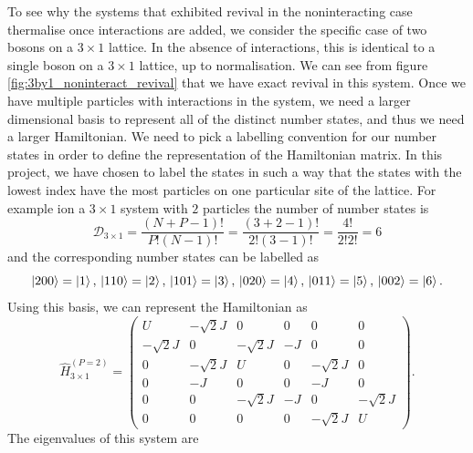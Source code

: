 \documentclass[a4paper, 10pt]{article}
\theoremstyle{plain}
\begin{document}
To see why the systems that exhibited revival in the noninteracting case
thermalise once interactions are added, we consider the specific case of
two bosons on a $3\times1$ lattice. In the absence of interactions, this
is identical to a single boson on a $3\times1$ lattice, up to normalisation.
We can see from figure \ref{fig:3by1_noninteract_revival} that we have exact revival
in this system. Once we have multiple particles with interactions in the system,
we need a larger dimensional basis to represent all of the distinct number
states, and thus we need a larger Hamiltonian. We need to pick a labelling
convention for our number states in order to define the representation of
the Hamiltonian matrix. In this project, we have chosen to label the states
in such a way that the states with the lowest index have the most particles on
one particular site of the lattice. For example ion a $3 \times 1$ system with
$2$ particles the number of number states is
\begin{equation*}
    \mathcal{D}_{3 \times 1} =
    \frac{(N + P - 1)!}{P! (N-1)!} =
    \frac{(3 + 2 - 1)!}{2! (3-1)!} = \frac{4!}{2! 2!} = 6
\end{equation*}
and the corresponding number states can be labelled as
\begin{equation*}
    \ket{200} = \ket{1},\,
    \ket{110} = \ket{2},\,
    \ket{101} = \ket{3},\,
    \ket{020} = \ket{4},\,
    \ket{011} = \ket{5},\,
    \ket{002} = \ket{6}.
\end{equation*}
Using this basis, we can represent the Hamiltonian as
\begin{equation}
    \hat{H}_{3\times1}^{\left(P=2\right)}
    =
    \begin{pmatrix}
             U & -\sqrt{2}J &          0 &   0 &          0 &          0 \\
    -\sqrt{2}J &          0 & -\sqrt{2}J &  -J &          0 &          0 \\
             0 & -\sqrt{2}J &          U &   0 & -\sqrt{2}J &          0 \\
             0 &         -J &          0 &   0 &         -J &          0 \\
             0 &          0 & -\sqrt{2}J &  -J &          0 & -\sqrt{2}J \\
             0 &          0 &          0 &   0 & -\sqrt{2}J &          U
    \end{pmatrix}.
\end{equation}
The eigenvalues of this system are
\end{document}
